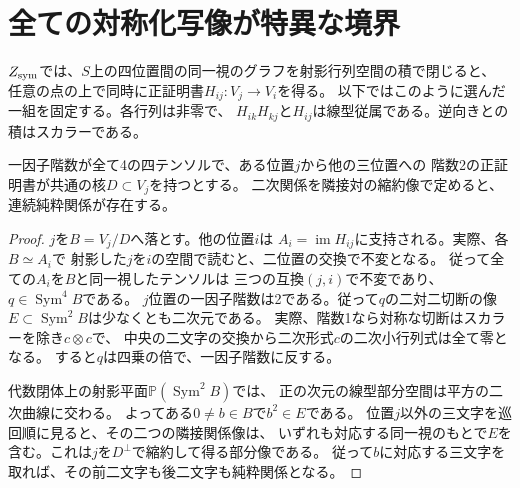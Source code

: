\section{全ての対称化写像が特異な境界}
\label{sec:singular-transfer-planes}
$Z_{\rm sym}$では、$S$上の四位置間の同一視のグラフを射影行列空間の積で閉じると、
任意の点の上で同時に正証明書$H_{ij}:V_j\to V_i$を得る。
以下ではこのように選んだ一組を固定する。各行列は非零で、
$H_{ik}H_{kj}$と$H_{ij}$は線型従属である。逆向きとの積はスカラーである。

\begin{lemma}[一位置からの三つの写像が二次元の核を共有する場合]\label{lem:three-common-binary-quotient}
一因子階数が全て4の四テンソルで、ある位置$j$から他の三位置への
階数2の正証明書が共通の核$D\subset V_j$を持つとする。
二次関係を隣接対の縮約像で定めると、連続純粋関係が存在する。
\end{lemma}
\begin{proof}
$j$を$B=V_j/D$へ落とす。他の位置$i$は
$A_i=\operatorname{im}H_{ij}$に支持される。実際、各$B\simeq A_i$で
射影した$j$を$i$の空間で読むと、二位置の交換で不変となる。
従って全ての$A_i$を$B$と同一視したテンソルは
三つの互換$(j,i)$で不変であり、$q\in\operatorname{Sym}^4 B$である。
$j$位置の一因子階数は2である。従って$q$の二対二切断の像
$E\subset\operatorname{Sym}^2B$は少なくとも二次元である。
実際、階数1なら対称な切断はスカラーを除き$c\otimes c$で、
中央の二文字の交換から二次形式$c$の二次小行列式は全て零となる。
すると$q$は四乗の倍で、一因子階数に反する。

代数閉体上の射影平面$\mathbb P(\operatorname{Sym}^2 B)$では、
正の次元の線型部分空間は平方の二次曲線に交わる。
よってある$0\ne b\in B$で$b^2\in E$である。
位置$j$以外の三文字を巡回順に見ると、その二つの隣接関係像は、
いずれも対応する同一視のもとで$E$を含む。これは$j$を$D^\perp$で縮約して得る部分像である。
従って$b$に対応する三文字を取れば、その前二文字も後二文字も純粋関係となる。
\end{proof}

